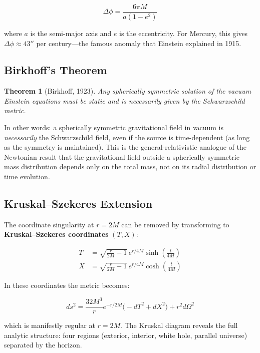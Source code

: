 \documentclass[12pt]{article}
\newtheorem{theorem}{Theorem}[section]
\theoremstyle{definition}
\theoremstyle{remark}
\begin{document}
\begin{equation}\label{eq:perihelion}
  \Delta\phi = \frac{6\pi M}{a(1-e^{2})}
\end{equation}

where $a$ is the semi-major axis and $e$ is the eccentricity. For Mercury, this gives $\Delta\phi \approx 43''$ per century---the famous anomaly that Einstein explained in 1915.

\subsection{Birkhoff's Theorem}\label{sec:birkhoff}

\begin{theorem}[Birkhoff, 1923]
  Any spherically symmetric solution of the vacuum Einstein equations must be static
  and is necessarily given by the Schwarzschild metric.
\end{theorem}

In other words: a spherically symmetric gravitational field in vacuum is \emph{necessarily} the Schwarzschild field, even if the source is time-dependent (as long as the symmetry is maintained). This is the general-relativistic analogue of the Newtonian result that the gravitational field outside a spherically symmetric mass distribution depends only on the total mass, not on its radial distribution or time evolution.

\subsection{Kruskal--Szekeres Extension}

The coordinate singularity at $r = 2M$ can be removed by transforming to \textbf{Kruskal--Szekeres coordinates} $(T, X)$:

\begin{align}
  T &= \sqrt{\frac{r}{2M} - 1}\,e^{r/4M}\sinh\!\left(\frac{t}{4M}\right) \\
  X &= \sqrt{\frac{r}{2M} - 1}\,e^{r/4M}\cosh\!\left(\frac{t}{4M}\right)
\end{align}

In these coordinates the metric becomes:

\begin{equation}
  ds^{2} = \frac{32M^{3}}{r}e^{-r/2M}\big(-dT^{2} + dX^{2}\big) + r^{2}d\Omega^{2}
\end{equation}

which is manifestly regular at $r = 2M$. The Kruskal diagram reveals the full analytic structure: four regions (exterior, interior, white hole, parallel universe) separated by the horizon.
\end{document}
